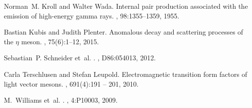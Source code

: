\documentclass[epj]{webofc}
\begin{document}
\begin{thebibliography}{00}
Norman~M. Kroll and Walter Wada.
\newblock Internal pair production associated with the emission of high-energy
  gamma rays.
, 98:1355--1359, 1955.

Bastian Kubis and Judith Plenter.
\newblock Anomalous decay and scattering processes of the $\eta$ meson.
, 75(6):1--12, 2015.

Sebastian~P. Schneider et~al.
.
, D86:054013, 2012.

Carla Terschlusen and Stefan Leupold.
\newblock Electromagnetic transition form factors of light vector mesons.
, 691(4):191 -- 201, 2010.

M.~Williams et~al.
.
, 4:P10003, 2009.

\end{thebibliography}
\end{document}
